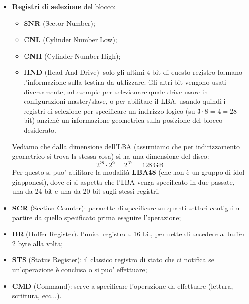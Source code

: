 \documentclass[a4paper,11pt]{article}
\begin{document}
\begin{itemize}
	\item \textbf{Registri di selezione} del blocco:
		\begin{itemize}
			\item \textbf{SNR} (Sector Number);
			\item \textbf{CNL} (Cylinder Number Low);
			\item \textbf{CNH} (Cylinder Number High);
			\item \textbf{HND} (Head And Drive): solo gli ultimi 4 bit di questo registro formano l'informazione sulla testina da utilizzare.
				Gli altri bit vengono usati diversamente, ad esempio per selezionare quale drive usare in configurazioni master/slave, o per abilitare il LBA, usando quindi i registri di selezione per specificare un indirizzo logico (su $3 \cdot 8 = 4 = 28$ bit) anzichè un informazione geometrica sulla posizione del blocco desiderato.
		\end{itemize}

		Vediamo che dalla dimensione dell'LBA (assumiamo che per indirizzamento geometrico si trova la stessa cosa) si ha una dimensione del disco:
		$$
		2^{28} \cdot 2^9 = 2^{37} = 128 \, \mathrm{GB}
		$$
		Per questo si puo' abilitare la modalità \textbf{LBA48} (che non è un gruppo di idol giapponesi), dove ci si aspetta che l'LBA venga specificato in due passate, una da 24 bit e una da 20 bit sugli stessi registri.
	\item \textbf{SCR} (Section Counter): permette di specificare su quanti settori contigui a partire da quello specificato prima eseguire l'operazione;
	\item \textbf{BR} (Buffer Register): l'unico registro a 16 bit, permette di accedere al buffer 2 byte alla volta;
	\item \textbf{STS} (Status Register): il classico registro di stato che ci notifica se un'operazione è conclusa o si puo' effettuare;
	\item \textbf{CMD} (Command): serve a specificare l'operazione da effettuare (lettura, scrittura, ecc...).
\end{itemize}
\end{document}
